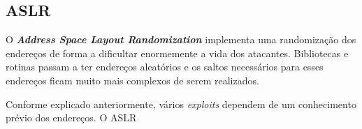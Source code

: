 		\subsection{ASLR}
			O \textsl{\textbf{Address Space Layout Randomization}} implementa uma randomização
			dos endereços de forma a dificultar enormemente a vida dos atacantes.
			Bibliotecas e rotinas passam a ter endereços aleatórios e os saltos necessários
			para esses endereços ficam muito mais complexos de serem realizados.
			

			Conforme explicado anteriormente, vários \textsl{exploits} dependem de um conhecimento
			prévio dos endereços. O ASLR 

		

		
			
	
